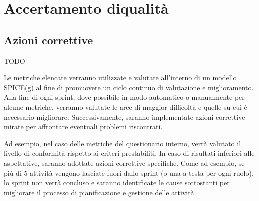 \section{Accertamento diqualità}










\subsection{Azioni correttive}
TODO

Le metriche elencate verranno utilizzate e valutate all'interno di un modello SPICE(g) al fine di promuovere un ciclo continuo di valutazione e miglioramento. Alla fine di ogni sprint, dove possibile in modo automatico o manualmente per alcune metriche, verranno valutate le aree di maggior difficoltà e quelle su cui è necessario migliorare. Successivamente, saranno implementate azioni correttive mirate per affrontare eventuali problemi riscontrati.

Ad esempio, nel caso delle metriche del questionario interno, verrà valutato il livello di conformità rispetto ai criteri prestabiliti. In caso di risultati inferiori alle aspettative, saranno adottate azioni correttive specifiche. Come ad esempio, se più di 5 attività vengono lasciate fuori dallo sprint (o una a testa per ogni ruolo), lo sprint non verrà concluso e saranno identificate le cause sottostanti per migliorare il processo di pianificazione e gestione delle attività.

